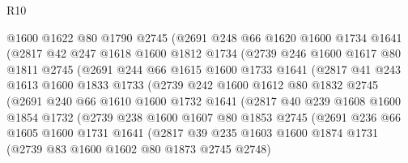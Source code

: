 \begin{lexlean}{R10}
\begin{coremodule}
              @1600
              @1622
              @80
              @1790
              @2745
              (@2691
                @248
                @66
                @1620
                @1600
                @1734
                @1641
                (@2817
                  @42
                  @247
                  @1618
                  @1600
                  @1812
                  @1734
                  (@2739
                    @246
                    @1600
                    @1617
                    @80
                    @1811
                    @2745
                    (@2691
                      @244
                      @66
                      @1615
                      @1600
                      @1733
                      @1641
                      (@2817
                        @41
                        @243
                        @1613
                        @1600
                        @1833
                        @1733
                        (@2739
                          @242
                          @1600
                          @1612
                          @80
                          @1832
                          @2745
                          (@2691
                            @240
                            @66
                            @1610
                            @1600
                            @1732
                            @1641
                            (@2817
                              @40
                              @239
                              @1608
                              @1600
                              @1854
                              @1732
                              (@2739
                                @238
                                @1600
                                @1607
                                @80
                                @1853
                                @2745
                                (@2691
                                  @236
                                  @66
                                  @1605
                                  @1600
                                  @1731
                                  @1641
                                  (@2817
                                    @39
                                    @235
                                    @1603
                                    @1600
                                    @1874
                                    @1731
                                    (@2739 @83 @1600 @1602 @80 @1873 @2745 @2748)

\end{coremodule}
\end{lexlean}
